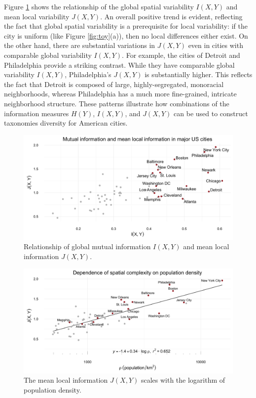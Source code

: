 	Figure \ref{fig:info_cross} shows the relationship of the global spatial variability $I(X,Y)$ and mean local variability $J(X,Y)$. An overall positive trend is evident, reflecting the fact that global spatial variability is a prerequisite for local variability: if the city is uniform (like Figure \ref{fig:toy}(a)), then no local differences either exist.  On the other hand, there are substantial variations in $J(X,Y)$ even in cities with comparable global variability $I(X,Y)$. For example, the cities of Detroit and Philadelphia provide a striking contrast. While they have comparable global variability $I(X,Y)$, Philadelphia's $J(X,Y)$ is substantially higher. This reflects the fact that Detroit is composed of large, highly-segregated, monoracial neighborhoods, whereas Philadelphia has a much more fine-grained, intricate neighborhood structure. These patterns illustrate how combinations of the information measures $H(Y)$, $I(X,Y)$, and $J(X,Y)$ can be used to construct taxonomies diversity for American cities. 
	\begin{figure}
		\includegraphics[width=1\textwidth]{figs/mutual_fisher.png}
		\caption{Relationship of global mutual information $I(X,Y)$ and mean local information $J(X,Y)$.} 
		\label{fig:info_cross}
	\end{figure}	


	
	\begin{figure}
		\includegraphics[width=1\textwidth]{figs/density_fisher.png}
		\caption{The mean local information $J(X,Y)$ scales with the logarithm of population density.}
		\label{fig:density}
	\end{figure}	

